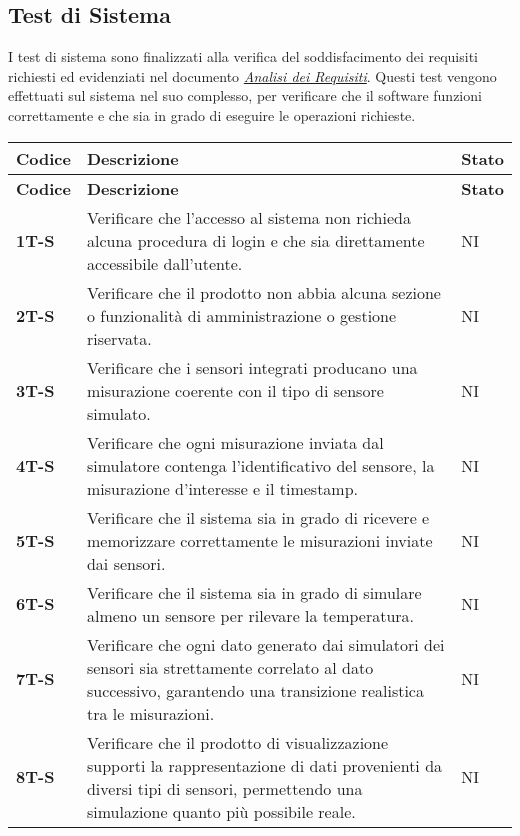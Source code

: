 \subsection{Test di Sistema}
I test di sistema sono finalizzati alla verifica del soddisfacimento dei requisiti richiesti ed evidenziati nel documento \href{https://7last.github.io/docs/rtb/documentazione-esterna/analisi-dei-requisiti}{\textit{Analisi dei Requisiti}}. Questi test vengono effettuati sul sistema nel suo complesso, per verificare che il software funzioni correttamente e che sia in grado di eseguire le operazioni richieste. \\
\begin{longtable}{|>{\raggedright\arraybackslash}m{}|>{\raggedright\arraybackslash}m{}|>{\raggedright\arraybackslash}m{}|}
	\hline
	\textbf{Codice} & \textbf{Descrizione} & \textbf{Stato} \\
	\hline
	\endfirsthead
	\hline
	\textbf{Codice} & \textbf{Descrizione} & \textbf{Stato} \\
	\endhead
	\textbf{1T-S}   & Verificare che l'accesso al sistema non richieda alcuna procedura di login e che sia direttamente accessibile dall'utente.     & NI             \\
	\hline
	\textbf{2T-S}   & Verificare che il prodotto non abbia alcuna sezione o funzionalità di amministrazione o gestione riservata.     & NI\\
	\hline
	\textbf{3T-S}   & Verificare che i sensori integrati producano una misurazione coerente con il tipo di sensore simulato.     & NI\\
	\hline
	\textbf{4T-S}   & Verificare che ogni misurazione inviata dal simulatore contenga l’identificativo del sensore, la misurazione d'interesse e il timestamp. & NI\\
	\hline
	\textbf{5T-S}   & Verificare che il sistema sia in grado di ricevere e memorizzare correttamente le misurazioni inviate dai sensori. & NI\\
	\hline
	\textbf{6T-S}   & Verificare che il sistema sia in grado di simulare almeno un sensore per rilevare la temperatura. & NI\\
	\hline
	\textbf{7T-S}   & Verificare che ogni dato generato dai simulatori dei sensori sia strettamente correlato al dato successivo, garantendo una transizione realistica tra le misurazioni. & NI\\
	\hline
	\textbf{8T-S}   & Verificare che il prodotto di visualizzazione supporti la rappresentazione di dati provenienti da diversi tipi di sensori, permettendo una simulazione quanto più possibile reale. & NI\\

\end{longtable}
